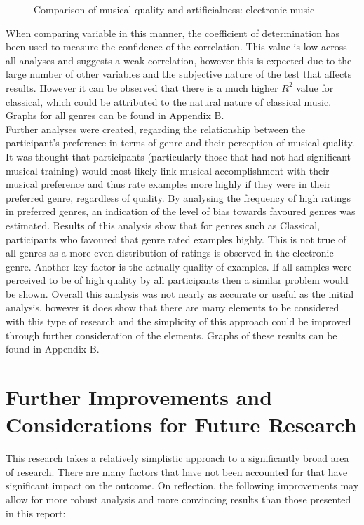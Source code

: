\documentclass[titlepage]{scrartcl}
\begin{document}
    \begin{figure}[H]
        \caption{Comparison of musical quality and artificialness: electronic music}
        \label{emvs}
    \end{figure}

    When comparing variable in this manner, the coefficient of determination
    has been used to measure the confidence of the correlation. This value is
    low across all analyses and suggests a weak correlation, however this is
    expected due to the large number of other variables and the subjective
    nature of the test that affects results. However it can be observed that
    there is a much higher $R^2$ value for classical, which could be attributed
    to the natural nature of classical music.
    Graphs for all genres can be found in Appendix B.\\

    Further analyses were created, regarding the relationship between the
    participant's preference in terms of genre and their perception of musical
    quality. It was thought that participants (particularly those that had not
    had significant musical training) would most likely link musical
    accomplishment with their musical preference and thus rate examples more
    highly if they were in their preferred genre, regardless of quality. By
    analysing the frequency of high ratings in preferred genres, an indication
    of the level of bias towards favoured genres was estimated. Results of this
    analysis show that for genres such as Classical, participants who favoured
    that genre rated examples highly. This is not true of all genres as a
    more even distribution of ratings is observed in the electronic genre.
    Another key factor is the actually quality of examples. If all samples were
    perceived to be of high quality by all participants then a similar problem
    would be shown. Overall this analysis was not nearly as accurate or useful
    as the initial analysis, however it does show that there are many elements
    to be considered with this type of research and the simplicity of this
    approach could be improved through further consideration of the elements.
    Graphs of these results can be found in Appendix B.

    \section{Further Improvements and Considerations for Future Research}
    This research takes a relatively simplistic approach to a significantly
    broad area of research. There are many factors that have not been accounted
    for that have significant impact on the outcome. On reflection, the
    following improvements may allow for more robust analysis and more
    convincing results than those presented in this report:
\end{document}
